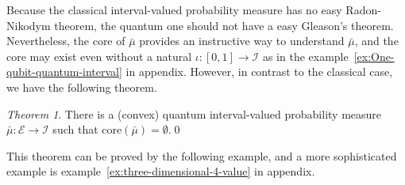 \documentclass{article}
\theoremstyle{remark}
\newtheorem{thm}{Theorem}
\newcommand{\events}{\ensuremath{\mathcal{E}}}
\begin{document}
Because the classical interval-valued probability measure has no easy
Radon-Nikodym theorem, the quantum one should not have a easy Gleason's
theorem. Nevertheless, the core of $\bar{\mu}$ provides an instructive
way to understand $\bar{\mu}$, and the core may exist even without
a natural $\iota:\left[0,1\right]\rightarrow\mathscr{I}$ as in the
example~\ref{ex:One-qubit-quantum-interval} in appendix. However,
in contrast to the classical case, we have the following theorem.

\begin{thm}\label{def:EmptyCoreQuantumInterval-valuedProbability}
There is a (convex) quantum interval-valued probability measure~$\bar{\mu}:\events\rightarrow\mathscr{I}$
such that $\mathrm{core}\left(\bar{\mu}\right)=\emptyset$.\qed\end{thm}

This theorem can be proved by the following example, and a more sophisticated
example is example~\ref{ex:three-dimensional-4-value} in appendix. 
\end{document}
